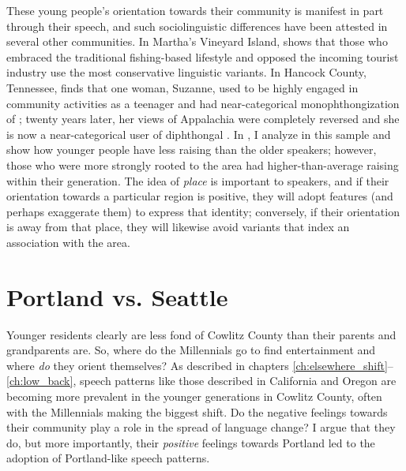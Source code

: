 These young people's orientation towards their community is manifest in part through their speech, and such sociolinguistic differences have been attested in several other communities. In Martha's Vineyard Island, \citet{labov_1963} shows that those who embraced the traditional fishing-based lifestyle and opposed the incoming tourist industry use the most conservative linguistic variants. In Hancock County, Tennessee, \citet{reed_2018} finds that one woman, Suzanne, used to be highly engaged in community activities as a teenager and had near-categorical monophthongization of \price; twenty years later, her views of Appalachia were completely reversed and she is now a near-categorical user of diphthongal \price. In \citet{stanley_2018_pwpl}, I analyze \bag in this sample and show how younger people have less raising than the older speakers; however, those who were more strongly rooted to the area had higher-than-average \bag raising within their generation. The idea of \textit{place} is important to speakers, and if their orientation towards a particular region is positive, they will adopt features (and perhaps exaggerate them) to express that identity; conversely, if their orientation is away from that place, they will likewise avoid variants that index an association with the area.




\section{Portland vs. Seattle}
\label{sec:portland_vs_seattle}

Younger residents clearly are less fond of Cowlitz County than their parents and grandparents are. So, where do the Millennials go to find entertainment and where \textit{do} they orient themselves? As described in chapters \ref{ch:elsewhere_shift}--\ref{ch:low_back}, speech patterns like those described in California and Oregon are becoming more prevalent in the younger generations in Cowlitz County, often with the Millennials making the biggest shift. Do the negative feelings towards their community play a role in the spread of language change? I argue that they do, but more importantly, their \textit{positive} feelings towards Portland led to the adoption of Portland-like speech patterns.

